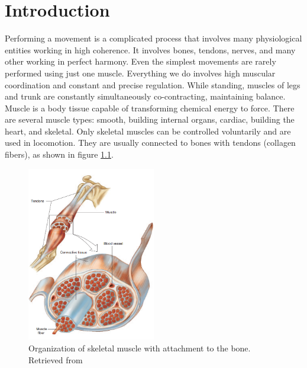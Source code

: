 
\chapter{Introduction}

Performing a movement is a complicated process that involves many physiological entities working in high coherence. It involves bones, tendons, nerves, and many other working in perfect harmony. Even the simplest movements are rarely performed using just one muscle. Everything we do involves high muscular coordination and constant and precise regulation. While standing, muscles of legs and trunk are constantly simultaneously co-contracting, maintaining balance.  
Muscle is a body tissue capable of transforming chemical energy to force. There are several muscle types: smooth, building internal organs, cardiac, building the heart, and skeletal. Only skeletal muscles can be controlled voluntarily and are used in locomotion. They are usually connected to bones with tendons (collagen fibers), as shown in figure \ref{fig:muscle}.
\begin{figure}[ht]
\centering
\includegraphics[width=0.5\textwidth]{Images/introduction/muscle.png}
\caption{Organization of skeletal muscle with attachment to the bone. Retrieved from \citep{Widmaier2014}}
\label{fig:muscle}
\end{figure}

